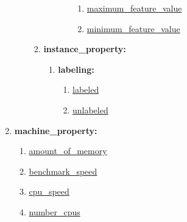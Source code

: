 \documentclass[a4paper,12pt, english]{article}
\begin{document}
\begin{enumerate}
\begin{enumerate}
\begin{enumerate}
\begin{enumerate}
\begin{enumerate}
\begin{enumerate}
				\item \underline{maximum\_feature\_value}
				\item \underline{minimum\_feature\_value}
				\end{enumerate}			
			\end{enumerate}		
		\end{enumerate}
	\item \textbf{instance\_property:}
		\begin{enumerate}
		\item \textbf{labeling:}
			\begin{enumerate}
			\item \underline{labeled}
			\item \underline{unlabeled}
			\end{enumerate}		
		\end{enumerate}	
\end{enumerate}

\end{enumerate}

\item \textbf{machine\_property:}
	\begin{enumerate}
	\item \underline{amount\_of\_memory}
	\item \underline{benchmark\_speed}
	\item \underline{cpu\_speed}
	\item \underline{number\_cpus}
	\end{enumerate}
\end{enumerate}
\newpage
\end{document}
